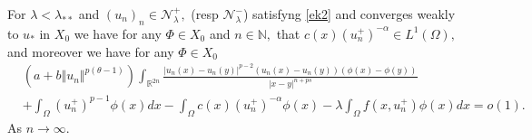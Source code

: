 \documentclass[10pt,twoside,reqno,centertags,draft]{amsart}
\begin{document}
\begin{lemma}\label{l8}
For $ \lambda < \lambda_{**}$ and $ (u_n)_n \in \mathcal{N}_{\lambda}^{+},$ (resp $ \mathcal{N}_{\lambda}^{-}$) 
satisfyng \ref{ek2} and converges weakly to $ u_*$ in $ X_0$ we have for any $ \Phi \in X_0$ and $ n \in \mathbb{N},$ 
that $ c(x)(u_n^+)^{-\alpha} \in L^{1}(\Omega),$ and moreover we have for any 
$ \Phi \in X_0$ 
\begin{equation}
\begin{aligned}
& \left(a +b\Vert u_n \Vert^{p(\theta -1)}\right) \int_{\mathbb{R}^{2n}} \frac{\vert u_n(x) - u_n(y) \vert^{p-2}(u_n(x) - u_n(y))(\phi(x) - \phi(y))}{\vert x-y \vert^{n + ps}}\\
& + \int_{\Omega}(u_n^+)^{p -1} \phi(x) dx  - \int_{\Omega} c(x) (u_n^+)^{-\alpha} \phi(x) - 
\lambda \int_{\Omega} f(x,u_n^+) \phi(x)dx = o(1).
\end{aligned}
\end{equation}
As $ n \to \infty.$
\end{lemma}
\end{document}
